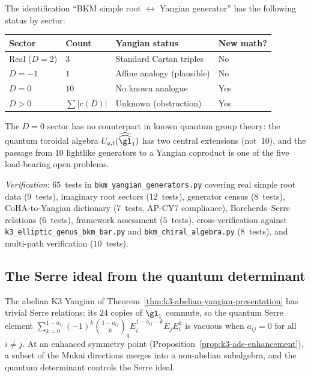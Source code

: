 \begin{remark}
\label{rem:bkm-yangian-framework}
The identification ``BKM simple root $\leftrightarrow$ Yangian generator'' has the following status by sector:
\begin{center}
\begin{tabular}{llll}
\toprule
\textbf{Sector} & \textbf{Count} & \textbf{Yangian status} & \textbf{New math?} \\
\midrule
Real ($D = 2$) & $3$ & Standard Cartan triples & No \\
$D = -1$ & $1$ & Affine analogy (plausible) & No \\
$D = 0$ & $10$ & No known analogue & Yes \\
$D > 0$ & $\sum |c(D)|$ & Unknown (obstruction) & Yes \\
\bottomrule
\end{tabular}
\end{center}
The $D = 0$ sector has no counterpart in known quantum group theory: the quantum toroidal algebra $U_{q,t}(\widehat{\widehat{\gl}}_1)$ has two central extensions (not~$10$), and the passage from $10$ lightlike generators to a Yangian coproduct is one of the five load-bearing open problems.
\end{remark}

\noindent\textit{Verification}: $65$~tests in
\texttt{bkm\_yangian\_generators.py}
covering real simple root data ($9$~tests), imaginary root sectors ($12$~tests), generator census ($8$~tests), CoHA-to-Yangian dictionary ($7$~tests, AP-CY7 compliance), Borcherds--Serre relations ($6$~tests), framework assessment ($5$~tests), cross-verification against \texttt{k3\_elliptic\_genus\_bkm\_bar.py} and \texttt{bkm\_chiral\_algebra.py} ($8$~tests), and multi-path verification ($10$~tests).


\subsection{The Serre ideal from the quantum determinant}
\label{subsec:k3-serre-from-qdet}

\noindent The abelian K3 Yangian of Theorem~\ref{thm:k3-abelian-yangian-presentation}
has trivial Serre relations: its $24$ copies of $\gl_1$ commute, so
the quantum Serre element $\sum_{k=0}^{1-a_{ij}} (-1)^k
\binom{1-a_{ij}}{k}_q E_i^{1-a_{ij}-k} E_j E_i^k$ is vacuous when
$a_{ij} = 0$ for all $i \neq j$.
At an enhanced symmetry point (Proposition~\ref{prop:k3-ade-enhancement}),
a subset of the Mukai directions merges into a non-abelian subalgebra,
and the quantum determinant controls the Serre ideal.

